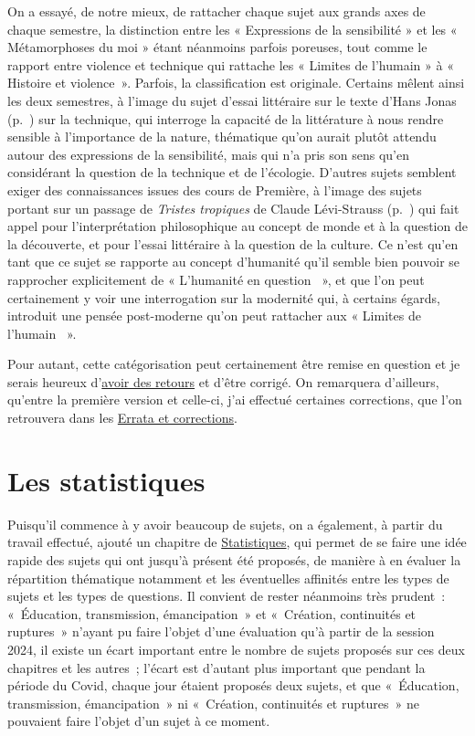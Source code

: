 On a essayé, de notre mieux, de rattacher chaque sujet aux grands axes de chaque semestre, la distinction entre les « Expressions de la sensibilité » et les « Métamorphoses du moi »{} étant néanmoins parfois poreuses, tout comme le rapport entre violence et technique qui rattache les « Limites de l'humain » à « Histoire et violence~»{}. Parfois, la classification est originale. Certains mêlent ainsi les deux semestres, à l'image du sujet d'essai littéraire sur le texte d'Hans Jonas (p.~\pageref{jonas-amérique2021}) sur la technique, qui interroge la capacité de la littérature à nous rendre sensible à l'importance de la nature, thématique qu'on aurait plutôt attendu autour des expressions de la sensibilité, mais qui n'a pris son sens qu'en considérant la question de la technique et de l'écologie. D'autres sujets semblent exiger des connaissances issues des cours de Première, à l'image des sujets portant sur un passage de \textit{Tristes tropiques} de Claude Lévi-Strauss (p.~\pageref{lévi-strauss-liban2022}) qui fait appel pour l'interprétation philosophique au concept de monde et à la question de la découverte, et pour l'essai littéraire à la question de la culture. Ce n'est qu'en tant que ce sujet se rapporte au concept d'humanité qu'il semble bien pouvoir se rapprocher explicitement de « L'humanité en question ~»{}, et que l'on peut certainement y voir une interrogation sur la modernité qui, à certains égards, introduit une pensée post-moderne qu'on peut rattacher aux « Limites de l'humain ~»{}.

Pour autant, cette catégorisation peut certainement être remise en question et je serais heureux d'\href{mailto:mikael.quesseveur@ac-lille.fr}{avoir des retours} et d'être corrigé. On remarquera d'ailleurs, qu'entre la première version et celle-ci, j'ai effectué certaines corrections, que l'on retrouvera dans les 
\hyperlink{errata}{Errata et corrections}.

\section*{Les statistiques}

Puisqu'il commence à y avoir beaucoup de sujets, on a également, à partir du travail effectué, ajouté un chapitre de \hyperlink{statistiques}{Statistiques}, qui permet de se faire une idée rapide des sujets qui ont jusqu'à présent été proposés, de manière à en évaluer la répartition thématique notamment et les éventuelles affinités entre les types de sujets et les types de questions. Il convient de rester néanmoins très prudent~: «~Éducation, transmission, émancipation~»{} et «~Création, continuités et ruptures~»{} n'ayant pu faire l'objet d'une évaluation qu'à partir de la session 2024, il existe un écart important entre le nombre de sujets proposés sur ces deux chapitres et les autres~; l'écart est d'autant plus important que pendant la période du Covid, chaque jour étaient proposés deux sujets, et que «~Éducation, transmission, émancipation~»{} ni «~Création, continuités et ruptures~»{} ne pouvaient faire l'objet d'un sujet à ce moment.

